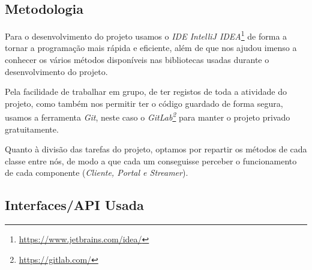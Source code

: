 \documentclass{article}
\begin{document}
\subsection{Metodologia}

Para o desenvolvimento do projeto usamos o \textit{IDE IntelliJ IDEA}\footnote{\url{https://www.jetbrains.com/idea/}} de forma a tornar a programação mais rápida e eficiente, além de que nos ajudou imenso a conhecer os vários métodos disponíveis nas bibliotecas usadas durante o desenvolvimento do projeto.

Pela facilidade de trabalhar em grupo, de ter registos de toda a atividade do projeto, como também nos permitir ter o código guardado de forma segura, usamos a ferramenta \textit{Git}, neste caso o \textit{GitLab\footnote{\url{https://gitlab.com/}}} para manter o projeto privado gratuitamente.

Quanto à divisão das tarefas do projeto, optamos por repartir os métodos de cada classe entre nós, de modo a que cada um conseguisse perceber o funcionamento de cada componente (\textit{Cliente, Portal e Streamer}).


\subsection{Interfaces/API Usada}
\end{document}
